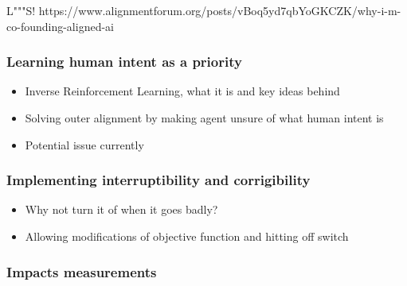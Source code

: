 \documentclass[12pt,A4]{report}
\newcommand{\autobaj}{}
\theoremstyle{definition}
\begin{document}
L"""S!
https://www.alignmentforum.org/posts/vBoq5yd7qbYoGKCZK/why-i-m-co-founding-aligned-ai
\subsubsection{Learning human intent as a priority}
\begin{itemize}
    \item Inverse Reinforcement Learning, what it is and key ideas behind
    \item Solving outer alignment by making agent unsure of what human intent is
    \item Potential issue currently

\end{itemize}

\subsubsection{Implementing interruptibility and corrigibility}
\begin{itemize}
    \item Why not turn it of when it goes badly?
    \item Allowing modifications of objective function and hitting off switch
\end{itemize}

\subsubsection{Impacts measurements}

\end{document}
